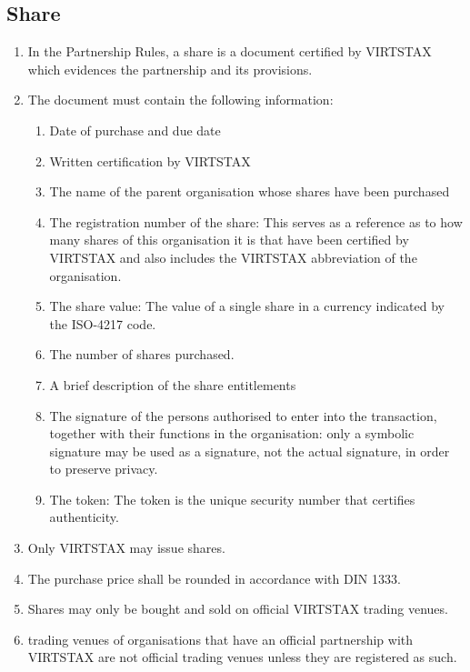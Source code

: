 \documentclass{article}
\begin{document}
\subsection{Share}
\begin{enumerate}[(1)]
	\item In the Partnership Rules, a share is a document certified by VIRTSTAX which evidences the partnership and its provisions.
	\item The document must contain the following information:
	\begin{enumerate}[1.]
		\item Date of purchase and due date
		\item Written certification by VIRTSTAX
		\item The name of the parent organisation whose shares have been purchased
		\item The registration number of the share: This serves as a reference as to how many shares of this organisation it is that have been certified by VIRTSTAX and also includes the VIRTSTAX abbreviation of the organisation.
		\item The share value: The value of a single share in a currency indicated by the ISO-4217 code.
		\item The number of shares purchased.
		\item A brief description of the share entitlements
		\item The signature of the persons authorised to enter into the transaction, together with their functions in the organisation: only a symbolic signature may be used as a signature, not the actual signature, in order to preserve privacy.
		\item The token: The token is the unique security number that certifies authenticity.
	\end{enumerate}
	\item Only VIRTSTAX may issue shares.
	\item The purchase price shall be rounded in accordance with DIN 1333.
	\item Shares may only be bought and sold on official VIRTSTAX trading venues.
	\item trading venues of organisations that have an official partnership with VIRTSTAX are not official trading venues unless they are registered as such.
\end{enumerate}
\end{document}
